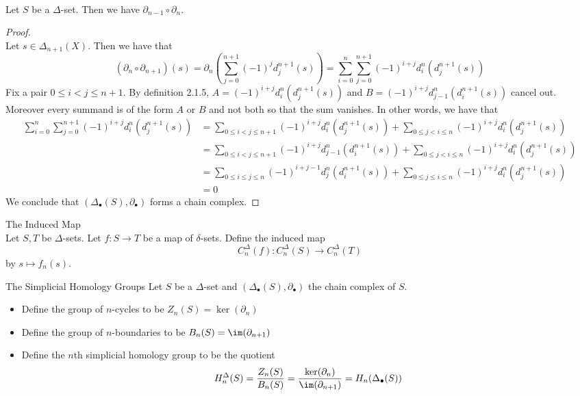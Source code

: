 \documentclass[a4paper]{article}
\begin{document}
\begin{prp}{}{}\\
Let $S$ be a $\Delta$-set. Then we have $\partial_{n-1}\circ\partial_n$. 
\begin{proof}\\
Let $s\in\Delta_{n+1}(X)$. Then we have that $$(\partial_n\circ\partial_{n+1})(s)=\partial_n\left(\sum_{j=0}^{n+1}(-1)^jd_j^{n+1}(s)\right)=\sum_{i=0}^n\sum_{j=0}^{n+1}(-1)^{i+j}d_i^n(d_j^{n+1}(s))$$ Fix a pair $0\leq i<j\leq n+1$. By definition 2.1.5, $A=(-1)^{i+j}d_i^n(d_j^{n+1}(s))$ and $B=(-1)^{i+j}d_{j-1}^n(d_i^{n+1}(s))$ cancel out. Moreover every summand is of the form $A$ or $B$ and not both so that the sum vanishes. In other words, we have that 
\begin{align*}
\sum_{i=0}^n\sum_{j=0}^{n+1}(-1)^{i+j}d_i^n(d_j^{n+1}(s))&=\sum_{0\leq i<j\leq n+1}(-1)^{i+j}d_i^n(d_j^{n+1}(s))+\sum_{0\leq j<i\leq n}(-1)^{i+j}d_i^n(d_j^{n+1}(s))\\
&=\sum_{0\leq i<j\leq n+1}(-1)^{i+j}d_{j-1}^n(d_i^{n+1}(s))+\sum_{0\leq j<i\leq n}(-1)^{i+j}d_i^n(d_j^{n+1}(s))\\
&=\sum_{0\leq i\leq j\leq n}(-1)^{i+j-1}d_j^n(d_i^{n+1}(s))+\sum_{0\leq j\leq i\leq n}(-1)^{i+j}d_i^n(d_j^{n+1}(s))\\
&=0
\end{align*}
We conclude that $(\Delta_\bullet(S),\partial_\bullet)$ forms a chain complex. 
\end{proof}
\end{prp}

\begin{defn}{The Induced Map}{}\\
Let $S,T$ be $\Delta$-sets. Let $f:S\to T$ be a map of $\delta$-sets. Define the induced map $$C_n^\Delta(f):C_n^\Delta(S)\to C_n^\Delta(T)$$ by $s\mapsto f_n(s)$. 
\end{defn}

\begin{defn}{The Simplicial Homology Groups}{} Let $S$ be a $\Delta$-set and $(\Delta_\bullet(S),\partial_\bullet)$ the chain complex of $S$. 
\begin{itemize}
\item Define the group of $n$-cycles to be $Z_n(S)=\ker(\partial_n)$
\item Define the group of $n$-boundaries to be $B_n(S)=\im(\partial_{n+1})$
\item Define the $n$th simplicial homology group to be the quotient $$H_n^\Delta(S)=\frac{Z_n(S)}{B_n(S)}=\frac{\ker(\partial_n)}{\im(\partial_{n+1})}=H_n(\Delta_\bullet(S))$$
\end{itemize}
\end{defn}
\end{document}
